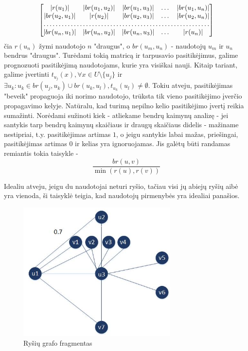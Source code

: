 \documentclass{VUMIFInfMagistrinis}
\begin{document}
\[
\begin{bmatrix}
|r(u_1)|       & |br(u_1,u_2)| & |br(u_1,u_3)| & \dots & |br(u_1, u_n)| \\
|br(u_2,u_1)|      & |r(u_2)| & |br(u_2,u_3)| & \dots & |br(u_2,u_n)| \\
\hdotsfor{5} \\
|br(u_n,u_1)|       & |br(u_n,u_2)| & |br(u_n,u_3)| & \dots & |r(u_n)|
\end{bmatrix}
\]
čia $r(u_n)$ žymi naudotojo $n$ "draugus", o  $br(u_m, u_n)$ - naudotojų $u_m$ ir $u_n$ bendrus "draugus". Turėdami tokią matricą ir tarpusavio pasitikėjimus, galime prognozuoti pasitikėjimą naudotojams, kurie yra visiškai nauji. Kitaip tariant, galime įvertinti $t_{u_j}(x), \forall x \in U\setminus \{u_j\}$ ir $\exists u_k : u_k \in br(u_j,u_k) \cup br(u_k,u_l), t_{u_k}(u_l) \neq \emptyset$. Tokiu atveju, pasitikėjimas "beveik" propaguoja iki norimo naudotojo, trūksta tik vieno pasitikėjimo įverčio propagavimo kelyje. Natūralu, kad turimą nepilno kelio pasitikėjimo įvertį reikia sumažinti. Norėdami sužinoti kiek - atliekame bendrų kaimynų analizę - jei santykis tarp bendrų kaimynų skaičiaus ir draugų skaičiaus didelis - mažiname nestipriai, t.y. pasitikėjimas artimas $1$, o jeigu santykis labai mažas, priešingai, pasitikėjimas artimas $0$ ir kelias yra ignoruojamas. Jis galėtų būti randamas remiantis tokia taisykle - 
\begin{equation}\label{rule:sim}
\frac{br(u,v)}{\min(r(u), r(v))}
\end{equation}

 Idealiu atveju, jeigu du naudotojai neturi ryšio, tačiau visi jų abiejų ryšių aibė yra vienoda, ši taisyklė teigia, kad naudotojų pirmenybės yra idealiai panašios.
\begin{figure}[ht!]
	\centering
	\includegraphics[width=80mm]{common_neighbors.jpg}
	\caption{Ryšių grafo fragmentas} \label{common_neighbors}
\end{figure}
\end{document}

